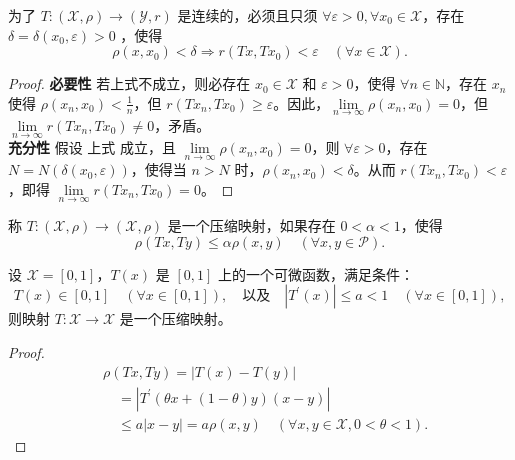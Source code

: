\documentclass[lang=cn,newtx,10pt,scheme=chinese,thmcnt=chapter]{elegantbook}
\begin{document}
\begin{proposition}
为了 $T:(\mathscr{X}, \rho) \rightarrow (\mathscr{Y}, r)$ 是连续的，必须且只须 $\forall \varepsilon>0, \forall x_0 \in \mathscr{X}$，存在 $\delta=\delta(x_0, \varepsilon)>0$ ，使得
\begin{equation*}
\rho\left(x, x_0\right) < \delta \Rightarrow r\left(T x, T x_0\right) < \varepsilon \quad (\forall x \in \mathscr{X}) .
\end{equation*}
\end{proposition}

\begin{proof}
\textbf{必要性} 若上式不成立，则必存在 $x_0 \in \mathscr{X}$ 和 $\varepsilon > 0$，使得 $\forall n \in \mathbb{N}$，存在 $x_n$ 使得 $\rho(x_n, x_0) < \frac{1}{n}$，但 $r(T x_n, T x_0) \geqslant \varepsilon$。因此，$\lim\limits_{n \rightarrow \infty} \rho(x_n, x_0) = 0$，但 $\lim\limits_{n \rightarrow \infty} r(T x_n, T x_0) \neq 0$，矛盾。\\
\textbf{充分性} 假设 上式 成立，且 $\lim\limits_{n \rightarrow \infty} \rho(x_n, x_0) = 0$，则 $\forall \varepsilon > 0$，存在 $N = N(\delta(x_0, \varepsilon))$，使得当 $n > N$ 时，$\rho(x_n, x_0) < \delta$。从而 $r(T x_n, T x_0) < \varepsilon$，即得 $\lim\limits_{n \rightarrow \infty} r(T x_n, T x_0) = 0$。
\end{proof}
\begin{definition}
称 $T:(\mathscr{X}, \rho) \rightarrow (\mathscr{X}, \rho)$ 是一个压缩映射，如果存在 $0 < \alpha < 1$，使得
\begin{equation*}
\rho(T x, T y) \leqslant \alpha \rho(x, y) \quad (\forall x, y \in \mathscr{P}) .
\end{equation*}
\end{definition}

\begin{example}
设 $\mathscr{X}= [0,1]$，$T(x)$ 是 $[0,1]$ 上的一个可微函数，满足条件：
\[
T(x) \in [0,1] \quad (\forall x \in [0,1]), \quad \text{以及} \quad \left| T^{\prime}(x) \right| \leqslant a < 1 \quad (\forall x \in [0,1]),
\]
则映射 $T: \mathscr{X} \rightarrow \mathscr{X}$ 是一个压缩映射。
\end{example}

\begin{proof}
\begin{equation*}
\begin{aligned}
& \rho(T x, T y) = |T(x) - T(y)| \\
& \quad = \left| T^{\prime}(\theta x + (1 - \theta) y) (x - y) \right| \\
& \quad \leqslant a |x - y| = a \rho(x, y) \quad (\forall x, y \in \mathscr{X}, 0 < \theta < 1) .
\end{aligned}
\end{equation*}
\end{proof}
\end{document}
